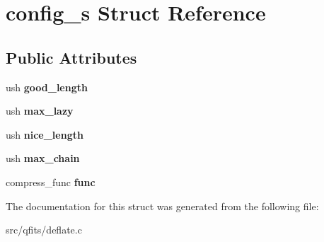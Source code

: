 \hypertarget{structconfig__s}{}\section{config\+\_\+s Struct Reference}
\label{structconfig__s}
\subsection*{Public Attributes}
\begin{DoxyCompactItemize}
\item 
\mbox{\label{structconfig__s_a36152319fbe49bebbc0354f8bcb617a6}} 
ush {\bfseries good\+\_\+length}
\item 
\mbox{\label{structconfig__s_afecf50eeeb2afca11ab28d344280231b}} 
ush {\bfseries max\+\_\+lazy}
\item 
\mbox{\label{structconfig__s_af2a1e023e10d6e0c9ff64f8c0c4c9894}} 
ush {\bfseries nice\+\_\+length}
\item 
\mbox{\label{structconfig__s_ac0ef64600cf4487e3754a21934ffdb89}} 
ush {\bfseries max\+\_\+chain}
\item 
\mbox{\label{structconfig__s_aea5a0fe31d694079966523a49d60174b}} 
compress\+\_\+func {\bfseries func}
\end{DoxyCompactItemize}


The documentation for this struct was generated from the following file\+:\begin{DoxyCompactItemize}
\item 
src/qfits/deflate.\+c\end{DoxyCompactItemize}
